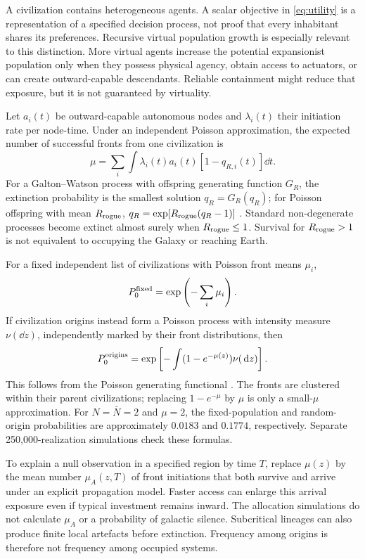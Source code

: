 A civilization contains heterogeneous agents. A scalar objective in \cref{eq:utility} is a representation of a specified decision process, not proof that every inhabitant shares its preferences. Recursive virtual population growth is especially relevant to this distinction. More virtual agents increase the potential expansionist population only when they possess physical agency, obtain access to actuators, or can create outward-capable descendants. Reliable containment might reduce that exposure, but it is not guaranteed by virtuality.

Let $a_i(t)$ be outward-capable autonomous nodes and $\lambda_i(t)$ their initiation rate per node-time. Under an independent Poisson approximation, the expected number of successful fronts from one civilization is
\begin{equation}
 \mu=\sum_i\int\lambda_i(t)a_i(t)[1-q_{R,i}(t)]\dd t.
 \label{eq:mu}
\end{equation}
For a Galton--Watson process with offspring generating function $G_R$, the extinction probability is the smallest solution $q_R=G_R(q_R)$; for Poisson offspring with mean $R_{\mathrm{rogue}}$, $q_R=\exp[R_{\mathrm{rogue}}(q_R-1)]$ \citep{Harris1963}. Standard non-degenerate processes become extinct almost surely when $R_{\mathrm{rogue}}\leq1$. Survival for $R_{\mathrm{rogue}}>1$ is not equivalent to occupying the Galaxy or reaching Earth.

For a fixed independent list of civilizations with Poisson front means $\mu_i$,
\begin{equation}
 P_0^{\rm fixed}=\exp\left(-\sum_i\mu_i\right).
 \label{eq:fixed}
\end{equation}
If civilization origins instead form a Poisson process with intensity measure $\nu(\dd z)$, independently marked by their front distributions, then
\begin{equation}
 P_0^{\rm origins}=\exp\left[-\int(1-e^{-\mu(z)})\nu(\,\mathrm{d} z)\right].
 \label{eq:origins}
\end{equation}
This follows from the Poisson generating functional \citep{LastPenrose2017}. The fronts are clustered within their parent civilizations; replacing $1-e^{-\mu}$ by $\mu$ is only a small-$\mu$ approximation. For $N=\bar N=2$ and $\mu=2$, the fixed-population and random-origin probabilities are approximately $0.0183$ and $0.1774$, respectively. Separate 250,000-realization simulations check these formulas.

To explain a null observation in a specified region by time $T$, replace $\mu(z)$ by the mean number $\mu_A(z,T)$ of front initiations that both survive and arrive under an explicit propagation model. Faster access can enlarge this arrival exposure even if typical investment remains inward. The allocation simulations do not calculate $\mu_A$ or a probability of galactic silence. Subcritical lineages can also produce finite local artefacts before extinction. Frequency among origins is therefore not frequency among occupied systems.

